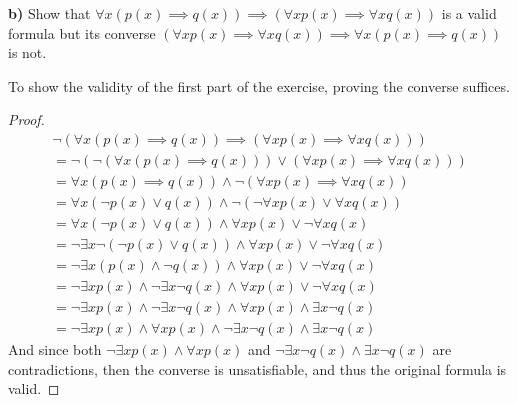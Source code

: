 \documentclass[titlepage, letterpaper, fleqn]{article}
\newcommand{\spacepls}{\vspace{5mm}}
\begin{document}
\spacepls

{\large \textbf{b)} Show that \(\forall x (p(x) \implies q(x)) \implies (\forall x p(x) \implies \forall x q(x))\) is a valid formula but its converse \((\forall x p(x) \implies \forall x q(x)) \implies \forall x (p(x) \implies q(x))\) is not.}

\spacepls

To show the validity of the first part of the exercise, proving the converse suffices.
\begin{proof}
\begin{align*}
&\neg(\forall x (p(x) \implies q(x)) \implies (\forall x p(x) \implies \forall x q(x))) & \tag*{Converse}
\\ & = \neg(\neg (\forall x (p(x) \implies q(x))) \vee (\forall x p(x) \implies \forall x q(x))) & \tag*{Material implication}
\\ & = \forall x (p(x) \implies q(x)) \wedge \neg (\forall x p(x) \implies \forall x q(x)) & \tag*{de Morgan}
\\ & =\forall x (\neg p(x) \vee q(x)) \wedge \neg(\neg \forall x p(x) \vee \forall x q(x)) & \tag*{Material implication}
\\ & =\forall x (\neg p(x) \vee q(x)) \wedge \forall x p(x) \vee \neg \forall x q(x) & \tag*{de Morgan}
\\ & = \neg \exists x \neg (\neg p(x) \vee q(x)) \wedge \forall x p(x) \vee \neg \forall x q(x) & \tag*{Duality of quantifiers}
\\ & = \neg \exists x (p(x) \wedge \neg q(x)) \wedge \forall x p(x) \vee \neg \forall x q(x) & \tag*{de Morgan}
\\ & = \neg \exists x p(x) \wedge \neg \exists x \neg q(x) \wedge \forall x p(x) \vee \neg \forall x q(x) & \tag*{\(\exists\) distributes over \(\wedge\)}
\\ & = \neg \exists x p(x) \wedge \neg \exists x \neg q(x) \wedge \forall x p(x) \wedge \exists x \neg q(x) & \tag*{Duality of quantifiers}
\\ & = \neg \exists x p(x) \wedge \forall x p(x) \wedge \neg \exists x \neg q(x) \wedge \exists x \neg q(x) & \tag*{\(\wedge\) is commutative}
\end{align*}
And since both \(\neg \exists x p(x) \wedge \forall x p(x)\) and \(\neg \exists x \neg q(x) \wedge \exists x \neg q(x)\) are contradictions, then the converse is unsatisfiable, and thus the original formula is valid.
\end{proof}

\spacepls
\end{document}
